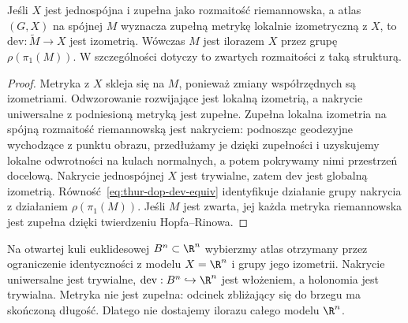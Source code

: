 \begin{stwierdzenie}
\label{prop:thur-dop-dev-kompletna}
Jeśli $X$ jest jednospójna i zupełna jako rozmaitość
riemannowska, a atlas $(G,X)$ na spójnej $M$ wyznacza
zupełną metrykę lokalnie izometryczną z $X$, to
$\mathrm{dev}:\widetilde M\to X$ jest izometrią.
Wówczas $M$ jest ilorazem $X$ przez grupę
$\rho(\pi_1(M))$. W szczególności dotyczy to
zwartych rozmaitości z taką strukturą.
\end{stwierdzenie}
\begin{proof}
Metryka z $X$ skleja się na $M$, ponieważ zmiany
współrzędnych są izometriami. Odwzorowanie rozwijające
jest lokalną izometrią, a nakrycie uniwersalne z podniesioną
metryką jest zupełne. Zupełna lokalna izometria
na spójną rozmaitość riemannowską jest nakryciem:
podnosząc geodezyjne wychodzące z punktu obrazu,
przedłużamy je dzięki zupełności i uzyskujemy lokalne
odwrotności na kulach normalnych, a potem pokrywamy nimi
przestrzeń docelową. Nakrycie jednospójnej $X$ jest
trywialne, zatem $\mathrm{dev}$ jest globalną izometrią.
Równość~\eqref{eq:thur-dop-dev-equiv} identyfikuje
działanie grupy nakrycia z działaniem $\rho(\pi_1(M))$.
Jeśli $M$ jest zwarta, jej każda metryka riemannowska
jest zupełna dzięki twierdzeniu Hopfa--Rinowa.
\end{proof}

\begin{przyklad}
\label{prz:thur-dop-struktura-niezupelna}
Na otwartej kuli euklidesowej $B^n\subset\R^n$ wybierzmy
atlas otrzymany przez ograniczenie identyczności
z modelu $X=\R^n$ i grupy jego izometrii. Nakrycie
uniwersalne jest trywialne, $\mathrm{dev}:B^n\hookrightarrow\R^n$
jest włożeniem, a holonomia jest trywialna.
Metryka nie jest zupełna: odcinek zbliżający się do brzegu
ma skończoną długość. Dlatego nie dostajemy
ilorazu całego modelu $\R^n$.
\end{przyklad}
